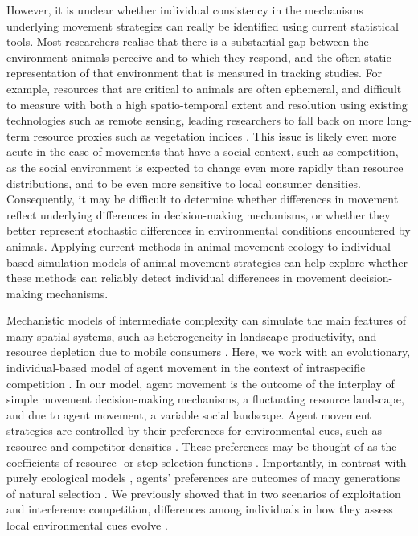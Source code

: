     However, it is unclear whether individual consistency in the mechanisms underlying movement strategies can really be identified using current statistical tools.
    Most researchers realise that there is a substantial gap between the environment animals perceive and to which they respond, and the often static representation of that environment that is measured in tracking studies.
    For example, resources that are critical to animals are often ephemeral, and difficult to measure with both a high spatio-temporal extent and resolution using existing technologies such as remote sensing, leading researchers to fall back on more long-term resource proxies such as vegetation indices \citep{pettorelli2011}.
    This issue is likely even more acute in the case of movements that have a social context, such as competition, as the social environment is expected to change even more rapidly than resource distributions, and to be even more sensitive to local consumer densities.
    Consequently, it may be difficult to determine whether differences in movement reflect underlying differences in decision-making mechanisms, or whether they better represent stochastic differences in environmental conditions encountered by animals.
    Applying current methods in animal movement ecology to individual-based simulation models of animal movement strategies \citep[see e.g.][]{getz2015,getz2016,netz2021,gupte2021a}can help explore whether these methods can reliably detect individual differences in movement decision-making mechanisms.
    
    Mechanistic models of intermediate complexity can simulate the main features of many spatial systems, such as heterogeneity in landscape productivity, and resource depletion due to mobile consumers \citep{getz2015,white2018,deangelis2019,netz2021,gupte2021a,diaz2021}.
    Here, we work with an evolutionary, individual-based model of agent movement in the context of intraspecific competition \citep[both exploitation and interference]{gupte2021a}.
    In our model, agent movement is the outcome of the interplay of simple movement decision-making mechanisms, a fluctuating resource landscape, and due to agent movement, a variable social landscape.
    Agent movement strategies are controlled by their preferences for environmental cues, such as resource and competitor densities \citep[see e.g.][]{getz2015,white2018,netz2021, gupte2021a}.
    These preferences may be thought of as the coefficients of resource- or step-selection functions \citep[][]{white2018,gupte2021a}.
    Importantly, in contrast with purely ecological models \citep[e.g.][]{white2018}, agents' preferences are outcomes of many generations of natural selection \citep[see also][]{getz2015,netz2021}.
    We previously showed that in two scenarios of exploitation and interference competition, differences among individuals in how they assess local environmental cues evolve \citep[][]{gupte2021a}.
    
